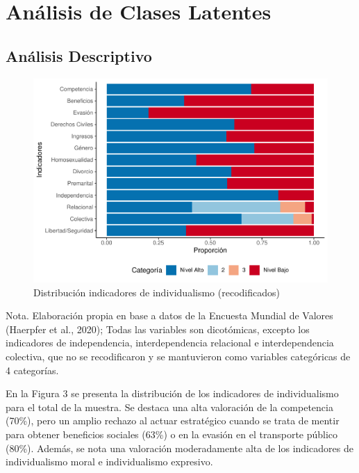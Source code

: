 \documentclass[12pt,oneside]{templates/facsothesis}
\begin{document}
\hypertarget{anuxe1lisis-de-clases-latentes-1}{%
\section*{Análisis de Clases Latentes}\label{anuxe1lisis-de-clases-latentes-1}}

\hypertarget{anuxe1lisis-descriptivo-1}{%
\subsection*{Análisis Descriptivo}\label{anuxe1lisis-descriptivo-1}}

\begin{figure}[H]

{\centering \includegraphics[width=1\linewidth,]{tesis_files/figure-latex/unnamed-chunk-7-1} 

}

\caption{Distribución indicadores de individualismo (recodificados)}\label{fig:unnamed-chunk-7}
\end{figure}
\FloatBarrier

Nota. Elaboración propia en base a datos de la Encuesta Mundial de Valores (Haerpfer et al., 2020); Todas las variables son dicotómicas, excepto los indicadores de independencia, interdependencia relacional e interdependencia colectiva, que no se recodificaron y se mantuvieron como variables categóricas de 4 categorías.

En la Figura 3 se presenta la distribución de los indicadores de individualismo para el total de la muestra. Se destaca una alta valoración de la competencia (70\%), pero un amplio rechazo al actuar estratégico cuando se trata de mentir para obtener beneficios sociales (63\%) o en la evasión en el transporte público (80\%). Además, se nota una valoración moderadamente alta de los indicadores de individualismo moral e individualismo expresivo.
\end{document}
